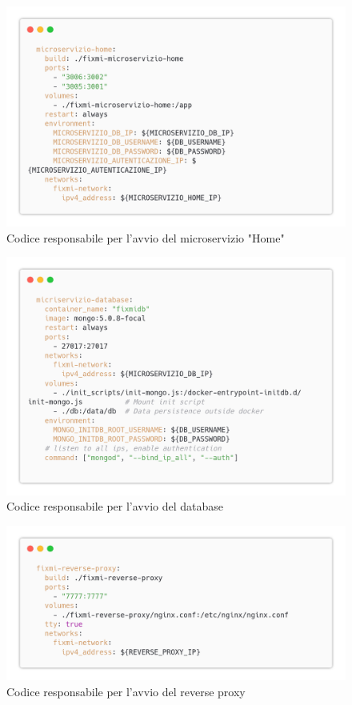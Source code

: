 \documentclass{report}
\begin{document}
\begin{figure}[H]
	\centering\includegraphics[width=1\textwidth]{images/yaml_home.png}
	Codice responsabile per l'avvio del microservizio "Home"
\end{figure}
\begin{figure}[H]
	\centering\includegraphics[width=1\textwidth]{images/yaml_database.png}
	Codice responsabile per l'avvio del database
\end{figure}
\begin{figure}[H]
	\centering\includegraphics[width=1\textwidth]{images/yaml_reverse_proxy.png}
	Codice responsabile per l'avvio del reverse proxy
\end{figure}
\end{document}
